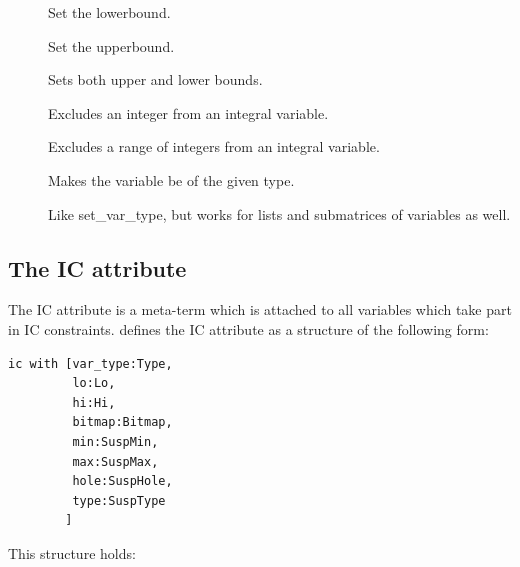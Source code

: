 \begin{description}
\item[]
Set the lowerbound.
\item[]
Set the upperbound.
\item[]
Sets both upper and lower bounds.
\item[]
Excludes an integer from an integral variable.
\item[]
Excludes a range of integers from an integral variable.
\item[]
Makes the variable be of the given type.
\item[]
Like set_var_type, but works for lists and submatrices of variables as well.
\end{description}

\subsection{The IC attribute}

The IC attribute is a meta-term which is attached to all variables which
take part in IC constraints.
 defines the IC
attribute as a structure of the following form:
\begin{verbatim}
ic with [var_type:Type,
         lo:Lo,
         hi:Hi,
         bitmap:Bitmap,
         min:SuspMin,
         max:SuspMax,
         hole:SuspHole,
         type:SuspType
        ]
\end{verbatim}


This structure holds:


